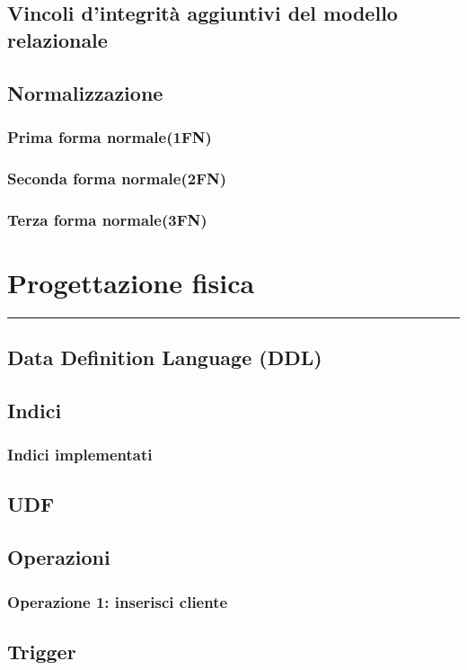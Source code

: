 \documentclass[a4paper]{article}
\begin{document}
\subsection{Vincoli d'integrità aggiuntivi del modello relazionale}

\subsection{Normalizzazione}
\subsubsection{Prima forma normale(1FN)}
\subsubsection{Seconda forma normale(2FN)}
\subsubsection{Terza forma normale(3FN)}

\newpage
\section{Progettazione fisica}
\rule{\linewidth}{1.5pt}
\subsection{Data Definition Language (DDL)}
\subsection{Indici}
\subsubsection{Indici implementati}
\subsection{UDF}
\subsection{Operazioni}
\subsubsection{Operazione 1: inserisci cliente}
\subsection{Trigger}
\end{document}
